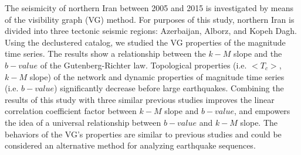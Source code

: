 %
The seismicity of northern Iran between 2005 and 2015 is investigated by means of the visibility graph (VG) method. For purposes of this study, northern Iran is divided into three tectonic seismic regions: Azerbaijan, Alborz, and Kopeh Dagh. Using the declustered catalog, we studied the VG properties of the magnitude time series. The results show a relationship between the $k-M$ slope and the $b-value$ of the Gutenberg-Richter law. Topological properties (i.e.  $< T_c >$, $k-M$ slope) of the network and dynamic properties of magnitude time series (i.e. $b-value$) significantly decrease before large earthquakes. Combining the results of this study with three similar previous studies improves the linear correlation coefficient factor between $k-M$ slope and $b-value$, and empowers the idea of a universal relationship between $b-value$ and $k-M$ slope. The behaviors of the VG's properties are similar to previous studies and could be considered an alternative method for analyzing earthquake sequences. 
